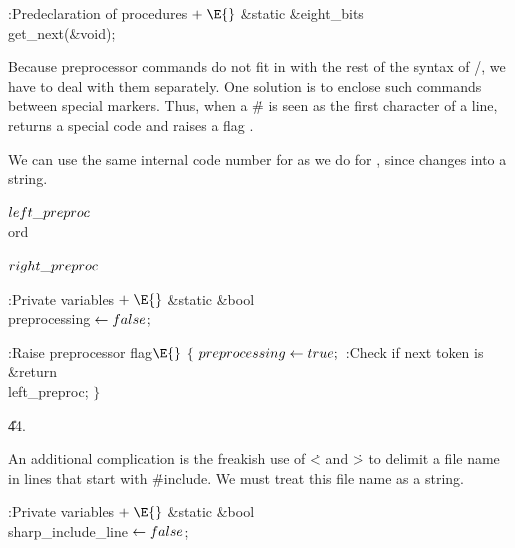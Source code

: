 \B{}:Predeclaration of procedures\X${}\mathrel+\E{}$\5
\&{static} \&{eight\_bits} \\{get\_next}(\&{void});\par
\fi

Because preprocessor commands do not fit in with the rest of the syntax
of \CEE/,
we have to deal with them separately.  One solution is to enclose such
commands between special markers.  Thus, when a \.\# is seen as the
first character of a line,  returns a special code
 and raises a flag .

We can use the same internal code number for  as we do
for , since  changes  into a string.

\Y\B\4\D$\\{left\_preproc}$ \5
\\{ord}\par
\B\4\D$\\{right\_preproc}$ \5
\par
\Y\B\4:Private variables\X${}\mathrel+\E{}$\6
\&{static} \&{bool} \\{preprocessing}${}\leftarrow\\{false}{}$;\par
\fi

\B{}:Raise preprocessor flag\X${}\E{}$\6
${}\{{}$\1\6
${}\\{preprocessing}\leftarrow\\{true};{}$\6
:Check if next token is \X\6
\&{return} \\{left\_preproc};\6
\4${}\}{}$\2\par
\U44.\fi

An additional complication is the freakish use of \.< and \.> to delimit
a file name in lines that start with \.{\#include}.  We must treat this file
name as a string.

\Y\B\4:Private variables\X${}\mathrel+\E{}$\6
\&{static} \&{bool} \\{sharp\_include\_line}${}\leftarrow\\{false}{}$;\par
\fi

